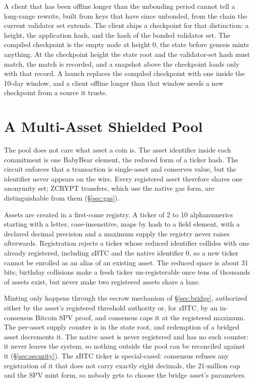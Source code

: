 \documentclass[twocolumn,10pt]{article}
\begin{document}
A client that has been offline longer than the unbonding period cannot tell a long-range rewrite, built from keys that have since unbonded, from the chain the current validator set extends. The client ships a checkpoint for that distinction: a height, the application hash, and the hash of the bonded validator set. The compiled checkpoint is the empty node at height 0, the state before genesis mints anything. At the checkpoint height the state root and the validator-set hash must match, the match is recorded, and a snapshot above the checkpoint loads only with that record. A launch replaces the compiled checkpoint with one inside the 10-day window, and a client offline longer than that window needs a new checkpoint from a source it trusts.

\section{A Multi-Asset Shielded Pool}
\label{sec:assets}

The pool does not care what asset a coin is. The asset identifier inside each commitment is one BabyBear element, the reduced form of a ticker hash. The circuit enforces that a transaction is single-asset and conserves value, but the identifier never appears on the wire. Every registered asset therefore shares one anonymity set; ZCRYPT transfers, which use the native gas form, are distinguishable from them (\S\ref{sec:gas}).

Assets are created in a first-come registry. A ticker of 2 to 10 alphanumerics starting with a letter, case-insensitive, maps by hash to a field element, with a declared decimal precision and a maximum supply the registry never raises afterwards. Registration rejects a ticker whose reduced identifier collides with one already registered, including zBTC and the native identifier 0, so a new ticker cannot be enrolled as an alias of an existing asset. The reduced space is about 31 bits; birthday collisions make a fresh ticker un-registerable once tens of thousands of assets exist, but never make two registered assets share a lane.

Minting only happens through the escrow mechanism of \S\ref{sec:bridge}, authorized either by the asset's registered threshold authority or, for zBTC, by an in-consensus Bitcoin SPV proof, and consensus caps it at the registered maximum. The per-asset supply counter is in the state root, and redemption of a bridged asset decrements it. The native asset is never registered and has no such counter: it never leaves the system, so nothing outside the pool can be reconciled against it (\S\ref{sec:security}). The zBTC ticker is special-cased: consensus refuses any registration of it that does not carry exactly eight decimals, the 21-million cap and the SPV mint form, so nobody gets to choose the bridge asset's parameters.
\end{document}
